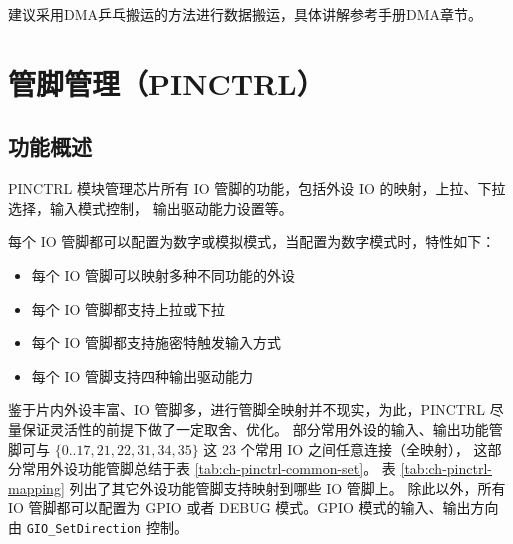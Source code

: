 \documentclass[
  12pt,
]{book}
\providecommand{\tightlist}{%
  \setlength{\itemsep}{0pt}\setlength{\parskip}{0pt}}
\begin{document}
建议采用DMA乒乓搬运的方法进行数据搬运，具体讲解参考手册DMA章节。

\hypertarget{ch-pinctrl}{%
\chapter{管脚管理（PINCTRL）}\label{ch-pinctrl}}

\hypertarget{ux529fux80fdux6982ux8ff0-3}{%
\section{功能概述}\label{ux529fux80fdux6982ux8ff0-3}}

PINCTRL 模块管理芯片所有 IO 管脚的功能，包括外设 IO 的映射，上拉、下拉选择，输入模式控制，
输出驱动能力设置等。

每个 IO 管脚都可以配置为数字或模拟模式，当配置为数字模式时，特性如下：

\begin{itemize}
\tightlist
\item
  每个 IO 管脚可以映射多种不同功能的外设
\item
  每个 IO 管脚都支持上拉或下拉
\item
  每个 IO 管脚都支持施密特触发输入方式
\item
  每个 IO 管脚支持四种输出驱动能力
\end{itemize}

鉴于片内外设丰富、IO 管脚多，进行管脚全映射并不现实，为此，PINCTRL 尽量保证灵活性的前提下做了一定取舍、优化。
部分常用外设的输入、输出功能管脚可与 \(\{{0 .. 17, 21, 22, 31, 34, 35\}}\) 这 23 个常用 IO 之间任意连接（全映射），
这部分常用外设功能管脚总结于表 \ref{tab:ch-pinctrl-common-set}。
表 \ref{tab:ch-pinctrl-mapping} 列出了其它外设功能管脚支持映射到哪些 IO 管脚上。
除此以外，所有 IO 管脚都可以配置为 GPIO 或者 DEBUG 模式。GPIO 模式的输入、输出方向由 \texttt{GIO\_SetDirection} 控制。
\end{document}
